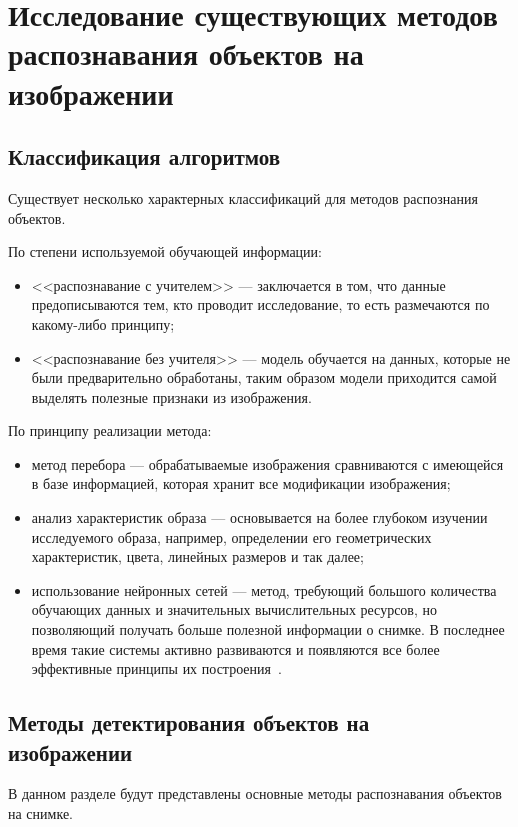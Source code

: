 \chapter{Исследование существующих методов \\распознавания объектов на изображении}

\section{Классификация алгоритмов}
Существует несколько характерных классификаций для методов распознания объектов.

По степени используемой обучающей информации:
\begin{itemize}[label=---]
    \item <<распознавание с учителем>> --- заключается в том, что данные предописываются тем, кто проводит исследование, то есть размечаются по какому-либо принципу;
    \item <<распознавание без учителя>> --- модель обучается на данных, которые не были предварительно обработаны, таким образом модели приходится самой выделять полезные признаки из изображения.
\end{itemize}

По принципу реализации метода:
\begin{itemize}[label=---]
    \item метод перебора --- обрабатываемые изображения сравниваются с имеющейся в базе информацией, которая хранит все модификации изображения;
    \item анализ характеристик образа --- основывается на более глубоком изучении исследуемого образа, например, определении его геометрических характеристик, цвета, линейных размеров и так далее;
    \item использование нейронных сетей --- метод, требующий большого количества обучающих данных и значительных вычислительных ресурсов, но позволяющий получать больше полезной информации о снимке. В последнее время такие системы активно развиваются и появляются все более эффективные принципы их построения~\cite{analysis_img}.
\end{itemize}

\section{Методы детектирования объектов на \\изображении}

В данном разделе будут представлены основные методы распознавания объектов на снимке.

